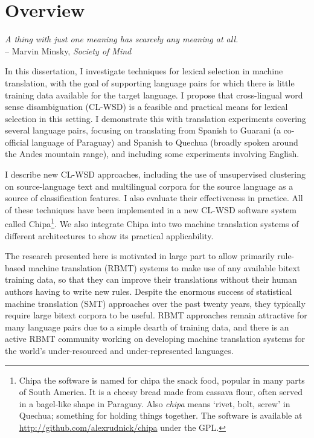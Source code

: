 \chapter{Overview}
\label{chap:overview}

\begin{centering}
\emph{A thing with just one meaning has scarcely any meaning at
all.} \\
-- Marvin Minsky, \emph{Society of Mind} \cite{minsky1988society} \\
\end{centering}
\bigskip

In this dissertation, I investigate techniques for lexical selection in
machine translation, with the goal of supporting language pairs for which 
there is little training data available for the target language. I propose
that cross-lingual word sense disambiguation (CL-WSD) is a feasible and
practical means for lexical selection in this setting. I demonstrate
this with translation experiments covering several language pairs, focusing on
translating from Spanish to Guarani (a co-official language of Paraguay) and
Spanish to Quechua (broadly spoken around the Andes mountain range), and
including some experiments involving English.

I describe new CL-WSD approaches, including the use of unsupervised clustering
on source-language text and multilingual corpora for the source language as a
source of classification features. I also evaluate their effectiveness in
practice. All of these techniques have been implemented in a new CL-WSD
software system called Chipa\footnote{Chipa the software is named for chipa the
snack food, popular in many parts of South America. It is a cheesy bread made
from cassava flour, often served in a bagel-like shape in Paraguay.  Also
\emph{chipa} means `rivet, bolt, screw' in Quechua; something for holding
things together.  The software is available at \\
\url{http://github.com/alexrudnick/chipa} under the GPL.}.
We also integrate Chipa into two machine translation systems of different
architectures to show its practical applicability.

The research presented here is motivated in large part to allow primarily
rule-based machine translation (RBMT) systems to make use of any available
bitext training data, so that they can improve their translations without their
human authors having to write new rules.  Despite the enormous
success of statistical machine translation (SMT) approaches over the past
twenty years, they typically require large bitext corpora to be useful. RBMT
approaches remain attractive for many language pairs due to a simple dearth of
training data, and there is an active RBMT community working on developing
machine translation systems for the world's under-resourced and
under-represented languages.

